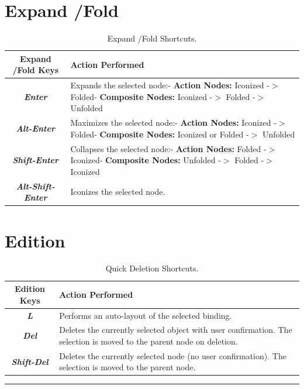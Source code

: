 \section{Expand \slash  Fold}
\label{expandfold}

\begin{table}[htbp]
\begin{minipage}{\linewidth}
\setlength{\tymax}{0.5\linewidth}
\centering
\small
\caption{Expand \slash  Fold Shortcuts.}
\label{expandfoldshortcuts.}
\begin{tabulary}{\textwidth}{@{}CL@{}} \toprule
Expand \slash  Fold Keys&Action Performed\\
\midrule
\textbf{\emph{Enter}}&Expands the selected node:- \textbf{Action Nodes:} Iconized -$>$ Folded- \textbf{Composite Nodes:} Iconized -$>$ Folded -$>$ Unfolded\\
\textbf{\emph{Alt-Enter}}&Maximizes the selected node:- \textbf{Action Nodes:} Iconized -$>$ Folded- \textbf{Composite Nodes:} Iconized or Folded -$>$ Unfolded\\
\textbf{\emph{Shift-Enter}}&Collapses the selected node:- \textbf{Action Nodes:} Folded -$>$ Iconized- \textbf{Composite Nodes:} Unfolded -$>$ Folded -$>$ Iconized\\
\textbf{\emph{Alt-Shift-Enter}}&Iconizes the selected node.\\

\bottomrule

\end{tabulary}
\end{minipage}
\end{table}

\section{Edition}
\label{edition}

\begin{table}[htbp]
\begin{minipage}{\linewidth}
\setlength{\tymax}{0.5\linewidth}
\centering
\small
\caption{Quick Deletion Shortcuts.}
\label{quickdeletionshortcuts.}
\begin{tabulary}{\textwidth}{@{}CL@{}} \toprule
Edition Keys&Action Performed\\
\midrule
\emph{\textbf{L}}&Performs an auto-layout of the selected binding.\\
\textbf{\emph{Del}}&Deletes the currently selected object with user confirmation. The selection is moved to the parent node on deletion.\\
\textbf{\emph{Shift-Del}}&Deletes the currently selected node (no user confirmation). The selection is moved to the parent node.\\

\bottomrule

\end{tabulary}
\end{minipage}
\end{table}

\begin{center}\rule{3in}{0.4pt}\end{center}





